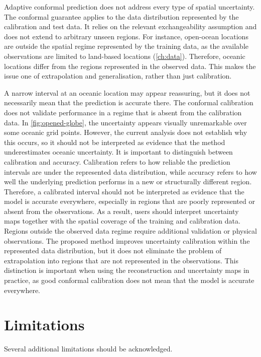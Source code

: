 Adaptive conformal prediction does not address every type of spatial uncertainty. The conformal guarantee applies to the data distribution represented by the calibration and test data. It relies on the relevant exchangeability assumption and does not extend to arbitrary unseen regions. For instance, open-ocean locations are outside the spatial regime represented by the training data, as the available observations are limited to land-based locations (\cref{ch:data}). Therefore, oceanic locations differ from the regions represented in the observed data. This makes the issue one of extrapolation and generalisation, rather than just calibration.

A narrow interval at an oceanic location may appear reassuring, but it does not necessarily mean that the prediction is accurate there. The conformal calibration does not validate performance in a regime that is absent from the calibration data. In \cref{fig:opened-globe}, the uncertainty appears visually unremarkable over some oceanic grid points. However, the current analysis does not establish why this occurs, so it should not be interpreted as evidence that the method underestimates oceanic uncertainty. It is important to distinguish between calibration and accuracy. Calibration refers to how reliable the prediction intervals are under the represented data distribution, while accuracy refers to how well the underlying prediction performs in a new or structurally different region. Therefore, a calibrated interval should not be interpreted as evidence that the model is accurate everywhere, especially in regions that are poorly represented or absent from the observations. As a result, users should interpret uncertainty maps together with the spatial coverage of the training and calibration data. Regions outside the observed data regime require additional validation or physical observations. The proposed method improves uncertainty calibration within the represented data distribution, but it does not eliminate the problem of extrapolation into regions that are not represented in the observations. This distinction is important when using the reconstruction and uncertainty maps in practice, as good conformal calibration does not mean that the model is accurate everywhere.

\section{Limitations}

Several additional limitations should be acknowledged. 

